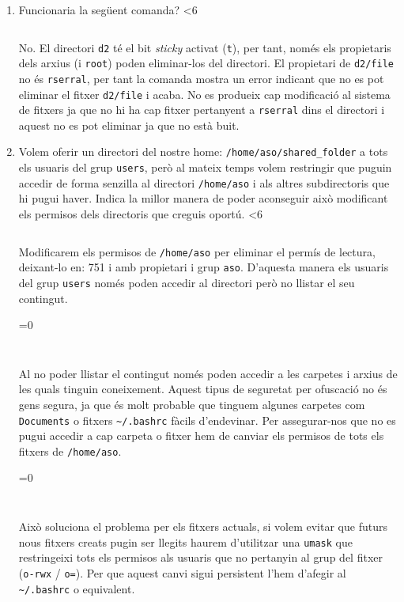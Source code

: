 \documentclass[12pt, oneside]{article}
\newcommand{\preglim}{6}
\newcommand{\preguntaminted}[1]{
    \ifnum#1<\preglim
        \inputminted[firstline=#1, lastline=#1]{shell-session}{commandes}
        \vspace{-2em}
    \else
        \vspace{1em}
    \fi
}
\newcommand{\pregunta}[1]{
    \vspace{2em}
\item #1 \preguntaminted{\theenumi}
    \addcontentsline{toc}{section}{Pregunta \theenumi}
}
\newcommand{\preg}[2][0]{
    \ifnum#1=0
        \inputminted[firstline=#2, lastline=#2]{shell-session}{preg6}
    \else
        \inputminted[firstline=#1, lastline=#2]{shell-session}{preg6}
    \fi
    \vspace{-2em}
}
\begin{document}
\begin{enumerate}

    \pregunta{Funcionaria la següent comanda?}

    No. El directori \texttt{d2} té el bit \emph{sticky} activat (\texttt{t}),
    per tant, només els propietaris dels arxius (i \texttt{root}) poden
    eliminar-los del directori. El propietari de \texttt{d2/file} no és
    \texttt{rserral}, per tant la comanda mostra un error indicant que no es pot
    eliminar el fitxer \texttt{d2/file} i acaba. No es produeix cap modificació
    al sistema de fitxers ja que no hi ha cap fitxer pertanyent a
    \texttt{rserral} dins el directori i aquest no es pot eliminar ja que no
    està buit.

    \vspace{2em}

    \pagebreak

    \pregunta{Volem oferir un directori del nostre home:
        \texttt{/home/aso/shared\_folder} a tots els usuaris del grup
        \texttt{users}, però al mateix temps volem restringir que puguin accedir
        de forma senzilla al directori \texttt{/home/aso} i als altres
        subdirectoris que hi pugui haver. Indica la millor manera de poder
        aconseguir això modificant els permisos dels directoris que creguis
    oportú.}

    \vspace{1em}

    Modificarem els permisos de \texttt{/home/aso} per eliminar el permís de
    lectura, deixant-lo en: 751 i amb propietari i grup \texttt{aso}. D'aquesta
    manera els usuaris del grup \texttt{users} només poden accedir al directori
    però no llistar el seu contingut.

    \preg[1]{2}

    Al no poder llistar el contingut només poden accedir a les carpetes i arxius
    de les quals tinguin coneixement. Aquest tipus de seguretat per ofuscació
    no és gens segura, ja que és molt probable que tinguem algunes carpetes com
    \texttt{Documents} o fitxers \texttt{\textasciitilde/.bashrc} fàcils
    d'endevinar. Per assegurar-nos que no es pugui accedir a cap carpeta o
    fitxer hem de canviar els permisos de tots els fitxers de
    \texttt{/home/aso}.

    \preg{3}

    Això soluciona el problema per els fitxers actuals, si volem evitar que futurs
    nous fitxers creats pugin ser llegits haurem d'utilitzar una \texttt{umask}
    que restringeixi tots els permisos als usuaris que no pertanyin al grup del
    fitxer (\texttt{o-rwx} / \texttt{o=}).  Per que aquest canvi sigui persistent l'hem
    d'afegir al \texttt{\textasciitilde/.bashrc} o equivalent.


\end{enumerate}
\end{document}

